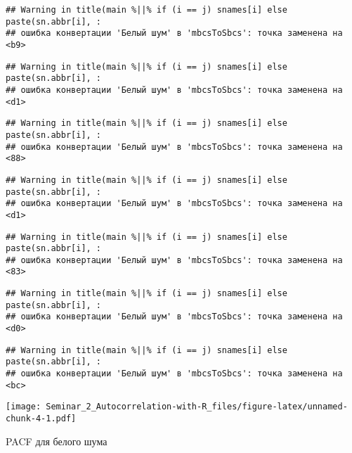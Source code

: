 \documentclass[
]{article}
\newenvironment{Shaded}{\begin{snugshade}}{\end{snugshade}}
\newcommand{\AttributeTok}[1]{\textcolor[rgb]{0.13,0.29,0.53}{#1}}
\newcommand{\ConstantTok}[1]{\textcolor[rgb]{0.56,0.35,0.01}{#1}}
\newcommand{\DecValTok}[1]{\textcolor[rgb]{0.00,0.00,0.81}{#1}}
\newcommand{\FunctionTok}[1]{\textcolor[rgb]{0.13,0.29,0.53}{\textbf{#1}}}
\newcommand{\NormalTok}[1]{#1}
\newcommand{\SpecialCharTok}[1]{\textcolor[rgb]{0.81,0.36,0.00}{\textbf{#1}}}
\begin{document}
\begin{verbatim}
## Warning in title(main %||% if (i == j) snames[i] else paste(sn.abbr[i], :
## ошибка конвертации 'Белый шум' в 'mbcsToSbcs': точка заменена на <b9>
\end{verbatim}

\begin{verbatim}
## Warning in title(main %||% if (i == j) snames[i] else paste(sn.abbr[i], :
## ошибка конвертации 'Белый шум' в 'mbcsToSbcs': точка заменена на <d1>
\end{verbatim}

\begin{verbatim}
## Warning in title(main %||% if (i == j) snames[i] else paste(sn.abbr[i], :
## ошибка конвертации 'Белый шум' в 'mbcsToSbcs': точка заменена на <88>
\end{verbatim}

\begin{verbatim}
## Warning in title(main %||% if (i == j) snames[i] else paste(sn.abbr[i], :
## ошибка конвертации 'Белый шум' в 'mbcsToSbcs': точка заменена на <d1>
\end{verbatim}

\begin{verbatim}
## Warning in title(main %||% if (i == j) snames[i] else paste(sn.abbr[i], :
## ошибка конвертации 'Белый шум' в 'mbcsToSbcs': точка заменена на <83>
\end{verbatim}

\begin{verbatim}
## Warning in title(main %||% if (i == j) snames[i] else paste(sn.abbr[i], :
## ошибка конвертации 'Белый шум' в 'mbcsToSbcs': точка заменена на <d0>
\end{verbatim}

\begin{verbatim}
## Warning in title(main %||% if (i == j) snames[i] else paste(sn.abbr[i], :
## ошибка конвертации 'Белый шум' в 'mbcsToSbcs': точка заменена на <bc>
\end{verbatim}

\texttt{[image: Seminar\_2\_Autocorrelation-with-R\_files/figure-latex/unnamed-chunk-4-1.pdf]}

PACF для белого шума

\begin{Shaded}
\end{Shaded}
\end{document}
